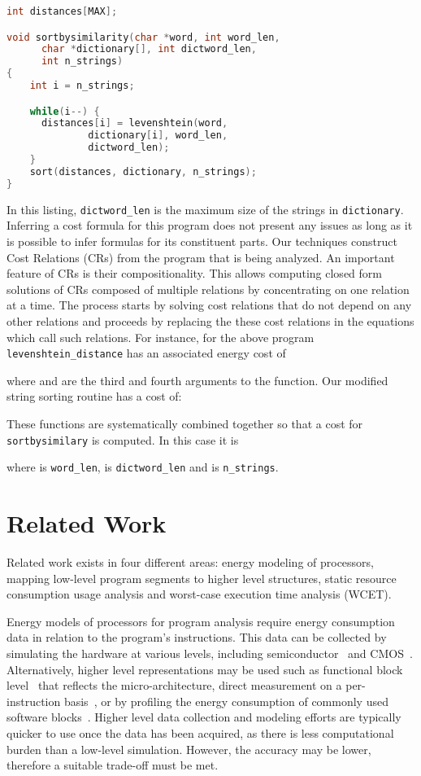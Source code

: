 \documentclass[9pt,preprint]{sigplanconf}
\begin{document}
\begin{lstlisting}[belowskip=-1pt, language=c,float,caption={Sort by similarity function,
    demonstrating that the analysis can be composed across multiple
    functions.},label=lst:composability_example]
int distances[MAX];

void sortbysimilarity(char *word, int word_len,
      char *dictionary[], int dictword_len,
      int n_strings)
{
    int i = n_strings;

    while(i--) {
      distances[i] = levenshtein(word,
              dictionary[i], word_len,
              dictword_len);
    }
    sort(distances, dictionary, n_strings);
}
\end{lstlisting}

In this listing, \texttt{dictword\_len} is the maximum size of the strings in
\texttt{dictionary}. Inferring a cost formula for this program does not present
any issues as long as it is possible to infer formulas for its constituent
parts. Our techniques construct Cost Relations (CRs) from the program that is being analyzed.
An important feature of CRs is their compositionality. This
allows computing closed form solutions of CRs composed of multiple relations by
concentrating on one relation at a time. The process starts by solving cost
relations that do not depend on any other relations and proceeds by replacing the
these cost relations in the equations which call such relations. For instance,
for the above program \texttt{levenshtein\_distance} has an associated energy
cost of

where  and  are the third and fourth arguments to the
function. Our modified string sorting routine has a cost of:

These functions are systematically combined together so that a cost for
\texttt{sortbysimilary} is computed. In this case it is

where  is \texttt{word\_len},  is \texttt{dictword\_len} and  is
\texttt{n\_strings}.

\section{Related Work}
Related work exists in four different areas: energy modeling of processors,
mapping low-level program segments to higher level structures, static resource consumption
usage analysis and worst-case execution time analysis (WCET).

Energy models of processors for program analysis require energy consumption data
in relation to the program's instructions. This data can be collected by
simulating the hardware at various levels, including
semiconductor~\cite{Nagel:M520} and CMOS~\cite{Bogliolo1997}.  Alternatively,
higher level representations may be used such as functional block
level~\cite{Steinke2001} that reflects the micro-architecture, direct
measurement on a per-instruction basis~\cite{Tiwari-embedded-1994}, or by
profiling the energy consumption of commonly used software
blocks~\cite{Qu-Function-level-2000}. Higher level data collection and modeling
efforts are typically quicker to use once the data has been acquired, as there
is less computational burden than a low-level simulation. However, the accuracy
may be lower, therefore a suitable trade-off must be met.
\end{document}

